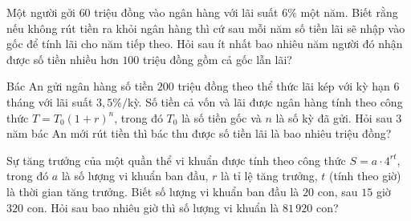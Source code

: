 \begin{ex}%
	Một người gởi $60$ triệu đồng vào ngân hàng với lãi suất  $6\%$ một năm. Biết rằng nếu không rút tiền ra khỏi ngân hàng thì cứ sau mỗi năm số tiền lãi sẽ nhập vào gốc để tính lãi cho năm tiếp theo. Hỏi sau ít nhất bao nhiêu năm người đó nhận được số tiền nhiều hơn $100$ triệu đồng gồm cả gốc lẫn lãi?
\end{ex}

\begin{ex}%
	Bác An gửi ngân hàng số tiền $200$ triệu đồng theo thể thức lãi kép với kỳ hạn $ 6$ tháng với lãi suất $3{,}5\%/$kỳ. Số tiền cả vốn và lãi được ngân  hàng tính theo công thức $T=T_0\left(1+r\right)^n$, trong đó $T_0$ là số tiền gốc và $n$ là số kỳ đã gửi. Hỏi sau 3 năm bác An mới rút tiền thì bác thu được số tiền lãi là bao nhiêu triệu đồng?
\end{ex}

\begin{bt}%
	Sự tăng trưởng của một quần thể vi khuẩn được tính theo công thức $S=a\cdot 4^{rt}$, trong đó $a$ là số lượng  vi khuẩn ban đầu, $r$ là tỉ lệ tăng trưởng, $t$ (tính theo giờ) là thời gian tăng trưởng. Biết số lượng vi khuẩn ban đầu là $20$ con, sau $15$ giờ $320$ con. Hỏi sau bao nhiêu giờ thì số lượng vi khuẩn là $81\,920$ con?
\end{bt}

